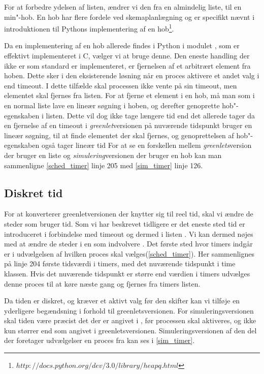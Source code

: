 For at forbedre ydelsen af  listen, 
ændrer vi den fra en almindelig liste, til en min"-hob. En hob har
flere fordele ved skemaplanlægning og er specifikt nævnt i introduktionen til Pythons implementering af en hob\footnote{$http://docs.python.org/dev/3.0/library/heapq.html$}. 

Da en implementering af en hob
allerede findes i Python i modulet , som er effektivt implementeret i C, vælger vi at bruge denne. Den eneste handling
der ikke er som standard er implementeret, er fjernelsen af et arbitrært element
fra hoben. Dette sker i den eksisterende løsning når en proces
aktivere et andet valg i  end timeout. I dette tilfælde skal
processen ikke vente på sin timeout, men elementet skal fjernes fra
 listen. For at fjerne et element i en hob, må man som i
en normal liste lave en lineær søgning i hoben, og derefter genoprette
hob"-egenskaben i listen. Dette vil dog ikke tage længere tid end det
allerede tager da en fjernelse af en timeout i \emph{greenlet}versionen på nuværende
tidspunkt bruger en lineær søgning, til at finde elementet der skal
fjernes, og genoprettelsen af hob"-egenskaben også tager lineær tid For at se en forskellen mellem \emph{greenlets}version der bruger en liste og \emph{simulering}versionen der bruger en hob kan man sammenligne \cref{sched_timer} linje 205 med \cref{sim_timer} linje 126.


\subsection{Diskret tid} For at konverterer greenletversionen der knytter sig til reel tid, skal vi ændre de steder som bruger tid. Som vi har beskrevet tidligere er det eneste sted tid er introduceret i forbindelse med timeout og dermed i listen . Vi kan dermed nøjes med at ændre de steder i \sched en som indvolvere . Det første sted hvor timers indgår er i udvælgelsen af hvilken proces skal vælges(\cref{sched_timer}). Her sammenlignes på linje 204  første tidsværdi i timers, med det nuværende tidspunkt i time klassen. Hvis det nuværende tidspunkt er større end værdien i timers udvælges denne proces til at køre næste gang og fjernes fra timers listen.

Da tiden er diskret, og kræver et aktivt valg før den skifter kan vi tilføje en yderligere begændsning i forhold til greenletsversionen. For simuleringsversionen skal tiden være præcist det der er angivet i , før processen skal aktiveres, og ikke kun størrer end som angivet i greenletsversionen.  Simuleringsversionen af den del der foretager udvælgelser en proces fra   kan ses i \cref{sim_timer}. 

